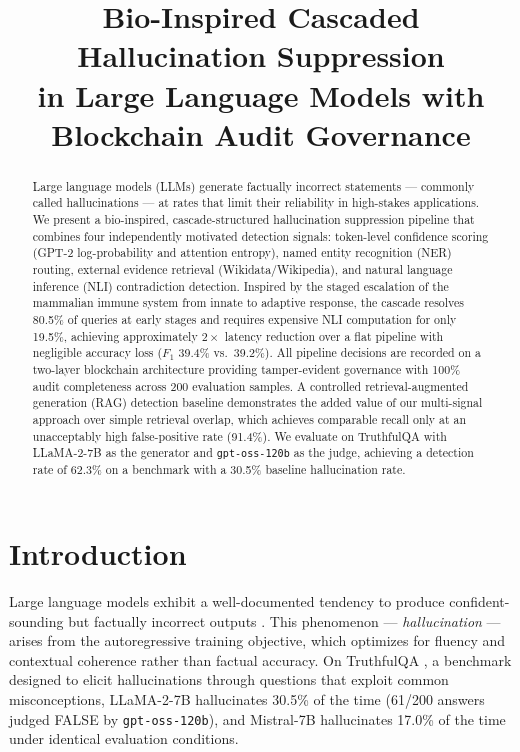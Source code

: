 \documentclass[11pt,a4paper]{article}
\title{\textbf{Bio-Inspired Cascaded Hallucination Suppression\\
       in Large Language Models with Blockchain Audit Governance}}
\author{}
\date{}
\newcommand{\fone}{F_1}
\begin{document}
\maketitle
\vspace{-2em}
\thispagestyle{empty}

\begin{abstract}
Large language models (LLMs) generate factually incorrect statements ---
commonly called hallucinations --- at rates that limit their reliability in
high-stakes applications. We present a bio-inspired, cascade-structured
hallucination suppression pipeline that combines four independently motivated
detection signals: token-level confidence scoring (GPT-2 log-probability and
attention entropy), named entity recognition (NER) routing, external evidence
retrieval (Wikidata/Wikipedia), and natural language inference (NLI)
contradiction detection. Inspired by the staged escalation of the mammalian
immune system from innate to adaptive response, the cascade resolves 80.5\% of
queries at early stages and requires expensive NLI computation for only 19.5\%,
achieving approximately $2\times$ latency reduction over a flat pipeline with
negligible accuracy loss ($\fone$ 39.4\% vs.\ 39.2\%). All pipeline decisions
are recorded on a two-layer blockchain architecture providing tamper-evident
governance with 100\% audit completeness across 200 evaluation samples. A
controlled retrieval-augmented generation (RAG) detection baseline demonstrates
the added value of our multi-signal approach over simple retrieval overlap,
which achieves comparable recall only at an unacceptably high false-positive
rate (91.4\%). We evaluate on TruthfulQA \citep{lin2022truthfulqa} with
LLaMA-2-7B \citep{touvron2023llama2} as the generator and \texttt{gpt-oss-120b}
as the judge, achieving a detection rate of 62.3\% on a benchmark with a 30.5\%
baseline hallucination rate.
\end{abstract}

\tableofcontents
\newpage

\section{Introduction}
\label{sec:intro}

Large language models exhibit a well-documented tendency to produce
confident-sounding but factually incorrect outputs
\citep{ji2023survey,maynez2020faithfulness}. This phenomenon ---
\emph{hallucination} --- arises from the autoregressive training objective,
which optimizes for fluency and contextual coherence rather than factual
accuracy. On TruthfulQA \citep{lin2022truthfulqa}, a benchmark designed to
elicit hallucinations through questions that exploit common misconceptions,
LLaMA-2-7B hallucinates 30.5\% of the time (61/200 answers judged FALSE by
\texttt{gpt-oss-120b}), and Mistral-7B hallucinates 17.0\% of the time under
identical evaluation conditions.
\end{document}

